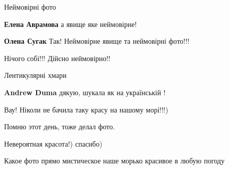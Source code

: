  
 
 
 
 

\qqSecCmt


Неймовірні фото

\begin{itemize} %
\textbf{Елена Аврамова} а явище яке неймовірне!

\textbf{Олена Сугак} Так! Неймовірне явище та неймовірні фото!!!
\end{itemize} %


Нічого собі!!! Дійсно неймовірно!!


Лентикулярні хмари 💙

\begin{itemize} %
\textbf{Andrew Duma} дякую, шукала як на українській !
\end{itemize} %


Вау! Ніколи не бачила таку красу на нашому морі!!!)


Помню этот день, тоже делал фото.


Невероятная красота!) спасибо)


Какое фото прямо мистическое наше морько красивое в любую погоду
